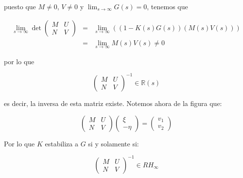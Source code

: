         puesto que $M \ne 0$, $V \ne 0$ y $\lim_{s \to \infty} G(s) = 0$, tenemos que

        \begin{eqnarray*}
            \lim_{s \to \infty} \det{
            \begin{pmatrix}
                M & U \\
                N & V
            \end{pmatrix}
            } & = & \lim_{s \to \infty} \left( \left( 1 - K(s) G(s) \right) \left( M(s) V(s) \right) \right) \\
            & = & \lim_{s \to \infty} M(s) V(s) \ne 0
        \end{eqnarray*}

        por lo que

        \begin{equation*}
            \begin{pmatrix}
                M & U \\
                N & V
            \end{pmatrix}^{-1} \in \mathbb{R}(s)
        \end{equation*}

        es decir, la inversa de esta matriz existe.
        Notemos ahora de la figura que:

        \begin{equation*}
            \begin{pmatrix}
                M & U \\
                N & V
            \end{pmatrix}
            \begin{pmatrix}
                \xi \\
                - \eta
            \end{pmatrix} =
            \begin{pmatrix}
                v_1 \\
                v_2
            \end{pmatrix}
        \end{equation*}

        Por lo que $K$ estabiliza a $G$ si y solamente si:

        \begin{equation*}
            \begin{pmatrix}
                M & U \\
                N & V
            \end{pmatrix}^{-1} \in RH_{\infty}
        \end{equation*}
